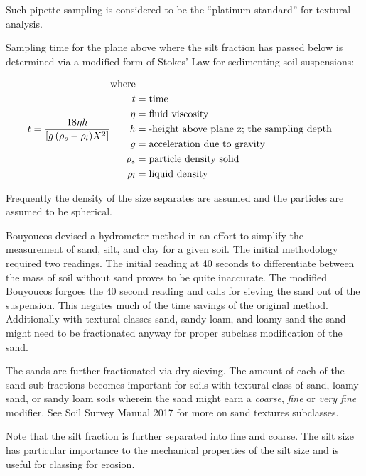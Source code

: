 \documentclass{book}
\begin{document}
Such pipette sampling is considered to be the “platinum standard” for textural analysis.

Sampling time for the plane above where the silt fraction has passed below is determined via a modified form of Stokes’ Law for sedimenting soil suspensions:

\begin{equation}
    t=\frac{18\eta h} {[g\,(\rho_s - \rho_l)X^2]} \\
    \begin{aligned}
        \text{where} \\
        t &= \text{time} \\
        \eta &= \text{fluid viscosity} \\
        h &= \text{-height above plane z; the sampling depth} \\
        g &= \text{acceleration due to gravity} \\
        \rho_s &= \text{particle density solid} \\
        \rho_l &= \text{liquid density} \\
    \end{aligned}
\end{equation}
        
Frequently the density of the size separates are assumed and the particles are assumed to be spherical.

Bouyoucos devised a hydrometer method in an effort to simplify the measurement of sand, silt, and clay for a given soil. The initial methodology required two readings. The initial reading at 40 seconds to differentiate between the mass of soil without sand proves to be quite inaccurate. The modified Bouyoucos forgoes the 40 second reading and calls for sieving the sand out of the suspension. This negates much of the time savings of the original method. Additionally with textural classes sand, sandy loam, and loamy sand the sand might need to be fractionated anyway for proper subclass modification of the sand.

The sands are further fractionated via dry sieving. The amount of each of the sand sub-fractions becomes important for soils with textural class of sand, loamy sand, or sandy loam soils wherein the sand might earn a \emph{coarse}, \emph{fine} or \emph{very fine} modifier. See Soil Survey Manual 2017 for more on sand textures subclasses.

Note that the silt fraction is further separated into fine and coarse. The silt size has particular importance to the mechanical properties of the silt size and is useful for classing for erosion.
\end{document}

